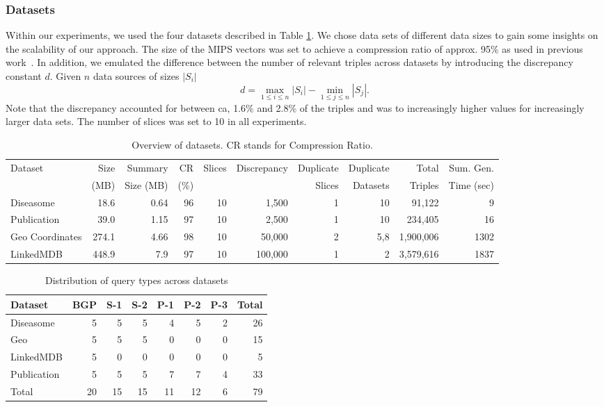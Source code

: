 \documentclass{sig-alternate}  %
\begin{document}
\subsubsection{Datasets}
Within our experiments, we used the four datasets described in Table \ref{tab:datasets}.
We chose data sets of different data sizes to gain some insights on the scalability of our approach.
The size of the MIPS vectors was set to achieve a compression ratio of approx. 95\% as used in previous work~\cite{key-6}.
In addition, we emulated the difference between the number of relevant triples across datasets by introducing the discrepancy constant $d$.
Given $n$ data sources of sizes $|S_i|$
\begin{equation}
d = \max\limits_{1 \leq i \leq n} |S_i| - \min\limits_{1 \leq j \leq n} |S_j|.
\end{equation}
Note that the discrepancy accounted for between ca, 1.6\% and 2.8\% of the triples and was to increasingly higher values for increasingly larger data sets.
The number of slices was set to 10 in all experiments.
\begin{table}
\centering
\begin{tabular}{lrrrrrrrrr}
\hline
Dataset & Size  & Summary 	& CR   & Slices & Discrepancy & Duplicate  & Duplicate & Total 	& Sum. Gen. \\
				& (MB) 	& Size (MB) & (\%) &	  		 &  					 & Slices 		& Datasets 	& Triples & Time (sec)\\
\hline
Diseasome 			& 18.6 	& 0.64 	& 96 & 10 & 1,500 		& 1 & 10 			& 91,122 & 9\\
Publication 						& 39.0	& 1.15 	& 97 & 10 & 2,500 		& 1 & 10 			& 234,405 & 16\\
Geo Coordinates & 274.1 & 4.66 	& 98 & 10 & 50,000 	& 2 & 5,8				& 1,900,006 & 1302\\
LinkedMDB 			& 448.9 & 7.9 	& 97 & 10 & 100,000 	& 1 & 2 			& 3,579,616 & 1837\\
\hline
\end{tabular}
\caption{Overview of datasets. CR stands for Compression Ratio.}
\label{tab:datasets}
\end{table}

\begin{table}
\centering
\begin{tabular}{lrrrrrrr}
\hline
Dataset 		& BGP  & S-1 & S-2 & P-1 & P-2 & P-3 & Total \\\hline
Diseasome 			& 5 & 5 & 5 & 4 & 5 & 2 & 26 \\
Geo  & 5 & 5 & 5 & 0 & 0 & 0 & 15 \\
LinkedMDB 			& 5 & 0 & 0 & 0 & 0 & 0 & 5 \\
Publication 		& 5 & 5 & 5 & 7 & 7 & 4 & 33 \\\hline
Total 					& 20 & 15 & 15 & 11 & 12 & 6 & 79\\
\hline
\end{tabular}
\caption{Distribution of query types across datasets}
\label{tab:queries}
\end{table}
\end{document}
